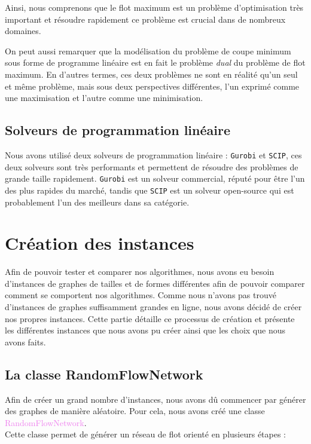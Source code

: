 \documentclass[a4paper]{article}
\begin{document}
Ainsi, nous comprenons que le flot maximum est un problème d'optimisation très important et résoudre rapidement ce problème est crucial dans de nombreux domaines.

On peut aussi remarquer que la modélisation du problème de coupe minimum sous forme de programme linéaire est en fait le problème \emph{dual} du problème de flot maximum. En d'autres termes, ces deux problèmes ne sont en réalité qu'un seul et même problème, mais sous deux perspectives différentes, l'un exprimé comme une maximisation et l'autre comme une minimisation.
\subsection{Solveurs de programmation linéaire}
Nous avons utilisé deux solveurs de programmation linéaire : \texttt{Gurobi} et \texttt{SCIP}, ces deux solveurs sont très performants et permettent de résoudre des problèmes de grande taille rapidement. \texttt{Gurobi} est un solveur commercial, réputé pour être l'un des plus rapides du marché, tandis que \texttt{SCIP} est un solveur open-source qui est probablement l'un des meilleurs dans sa catégorie.


\section{Création des instances}

Afin de pouvoir tester et comparer nos algorithmes, nous avons eu besoin d'instances de graphes de tailles et de formes différentes afin de pouvoir comparer comment se comportent nos algorithmes. Comme nous n'avons pas trouvé d'instances de graphes suffisamment grandes en ligne, nous avons décidé de créer nos propres instances. Cette partie détaille ce processus de création et présente les différentes instances que nous avons pu créer ainsi que les choix que nous avons faits.

\subsection{La classe RandomFlowNetwork}
Afin de créer un grand nombre d'instances, nous avons dû commencer par générer des graphes de manière aléatoire. Pour cela, nous avons créé une classe \textcolor{violet}{RandomFlowNetwork}.\\

Cette classe permet de générer un réseau de flot orienté en plusieurs étapes :
\end{document}
